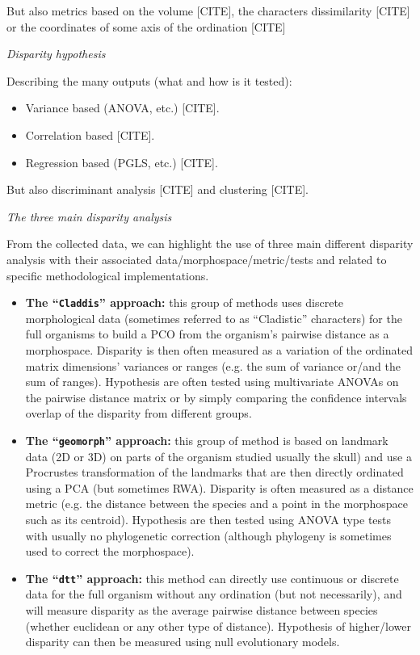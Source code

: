 \documentclass[12pt,letterpaper]{article}
\renewcommand{\subsection}[1]{%
\bigskip
\begin{center}
\begin{large}
\normalfont\itshape #1
\end{large}
\end{center}}
\begin{document}
But also metrics based on the volume [CITE], the characters dissimilarity [CITE] or the coordinates of some axis of the ordination [CITE]

\subsection{Disparity hypothesis}
Describing the many outputs (what and how is it tested):

\begin{itemize}
    \item Variance based (ANOVA, etc.) [CITE].
    \item Correlation based [CITE].
    \item Regression based (PGLS, etc.) [CITE].
\end{itemize}

But also discriminant analysis [CITE] and clustering [CITE].

\subsection{The three main disparity analysis}
From the collected data, we can highlight the use of three main different disparity analysis with their associated data/morphospace/metric/tests and related to specific methodological implementations.

\begin{itemize}
    \item \textbf{The ``\texttt{Claddis}'' approach:} this group of methods uses discrete morphological data (sometimes referred to as ``Cladistic'' characters) for the full organisms to build a PCO from the organism's pairwise distance as a morphospace. Disparity is then often measured as a variation of the ordinated matrix dimensions' variances or ranges (e.g. the sum of variance or/and the sum of ranges). Hypothesis are often tested using multivariate ANOVAs on the pairwise distance matrix or by simply comparing the confidence intervals overlap of the disparity from different groups. 

    \item \textbf{The ``\texttt{geomorph}'' approach:} this group of method is based on landmark data (2D or 3D) on parts of the organism studied usually the skull) and use a Procrustes transformation of the landmarks that are then directly ordinated using a PCA (but sometimes RWA). Disparity is often measured as a distance metric (e.g. the distance between the species and a point in the morphospace such as its centroid). Hypothesis are then tested using ANOVA type tests with usually no phylogenetic correction (although phylogeny is sometimes used to correct the morphospace).

    \item \textbf{The ``\texttt{dtt}'' approach:} this method can directly use continuous or discrete data for the full organism without any ordination (but not necessarily), and will measure disparity as the average pairwise distance between species (whether euclidean or any other type of distance). Hypothesis of higher/lower disparity can then be measured using null evolutionary models.

\end{itemize}
\end{document}
